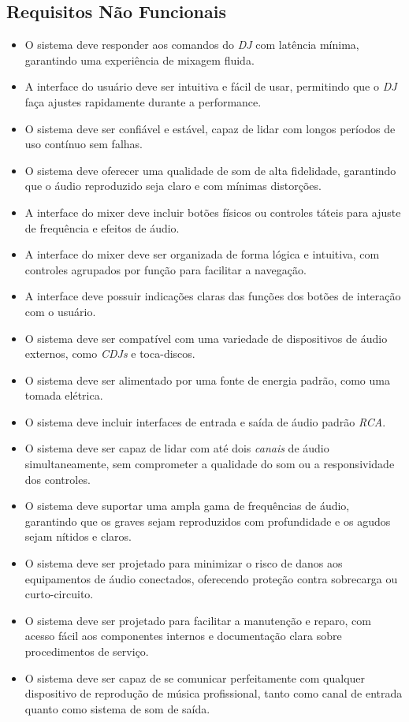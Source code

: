 \subsection{Requisitos Não Funcionais}
\begin{itemize}
    \item O sistema deve responder aos comandos do \textit{DJ} com latência mínima, garantindo uma experiência de mixagem fluida.
    \item A interface do usuário deve ser intuitiva e fácil de usar, permitindo que o \textit{DJ} faça ajustes rapidamente durante a performance.
    \item O sistema deve ser confiável e estável, capaz de lidar com longos períodos de uso contínuo sem falhas.
    \item O sistema deve oferecer uma qualidade de som de alta fidelidade, garantindo que o áudio reproduzido seja claro e com mínimas distorções.
    \item A interface do mixer deve incluir botões físicos ou controles táteis para ajuste de frequência e efeitos de áudio.
    \item A interface do mixer deve ser organizada de forma lógica e intuitiva, com controles agrupados por função para facilitar a navegação.
    \item A interface deve possuir indicações claras das funções dos botões de interação com o usuário.
    \item O sistema deve ser compatível com uma variedade de dispositivos de áudio externos, como \textit{CDJs} e toca-discos.
    \item O sistema deve ser alimentado por uma fonte de energia padrão, como uma tomada elétrica.
    \item O sistema deve incluir interfaces de entrada e saída de áudio padrão \textit{RCA}.
    \item O sistema deve ser capaz de lidar com até dois \textit{canais} de áudio simultaneamente, sem comprometer a qualidade do som ou a responsividade dos controles.
    \item O sistema deve suportar uma ampla gama de frequências de áudio, garantindo que os graves sejam reproduzidos com profundidade e os agudos sejam nítidos e claros.
    \item O sistema deve ser projetado para minimizar o risco de danos aos equipamentos de áudio conectados, oferecendo proteção contra sobrecarga ou curto-circuito.
    \item O sistema deve ser projetado para facilitar a manutenção e reparo, com acesso fácil aos componentes internos e documentação clara sobre procedimentos de serviço.
    \item O sistema deve ser capaz de se comunicar perfeitamente com qualquer dispositivo de reprodução de música profissional, tanto como canal de entrada quanto como sistema de som de saída.
\end{itemize}



